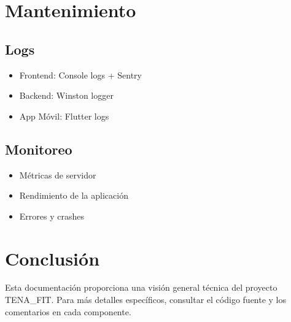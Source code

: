 \documentclass[12pt,a4paper]{article}
\begin{document}
\section{Mantenimiento}

\subsection{Logs}
\begin{itemize}
    \item Frontend: Console logs + Sentry
    \item Backend: Winston logger
    \item App Móvil: Flutter logs
\end{itemize}

\subsection{Monitoreo}
\begin{itemize}
    \item Métricas de servidor
    \item Rendimiento de la aplicación
    \item Errores y crashes
\end{itemize}

\section{Conclusión}
Esta documentación proporciona una visión general técnica del proyecto TENA\_FIT. Para más detalles específicos, consultar el código fuente y los comentarios en cada componente.
\end{document}
